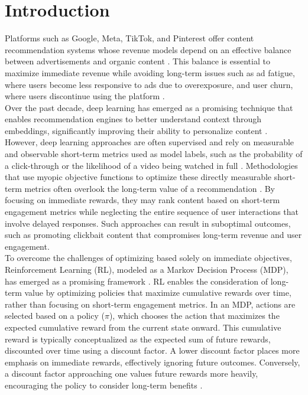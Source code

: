\documentclass[final]{anthology-ch}         %
\begin{document}
\section{Introduction}

Platforms such as Google, Meta, TikTok, and Pinterest offer content recommendation systems whose revenue models depend on an effective balance between advertisements and organic content \cite{zhao2020jointly} \cite{danescu2010competing}. This balance is essential to maximize immediate revenue while avoiding long-term issues such as ad fatigue, where users become less responsive to ads due to overexposure, and user churn, where users discontinue using the platform \cite{sagtani2023quantifying} \cite{silberstein2023combating}.\\

Over the past decade, deep learning has emerged as a promising technique that enables recommendation engines to better understand context through embeddings, significantly improving their ability to personalize content \cite{naumov2019deep} \cite{zhao2024survey}. However, deep learning approaches are often supervised and rely on measurable and observable short-term metrics used as model labels, such as the probability of a click-through or the likelihood of a video being watched in full \cite{nvidia_recommender_systems_2021}. Methodologies that use myopic objective functions to optimize these directly measurable short-term metrics often overlook the long-term value of a recommendation \cite{mazoure2021improving}. By focusing on immediate rewards, they may rank content based on short-term engagement metrics while neglecting the entire sequence of user interactions that involve delayed responses. Such approaches can result in suboptimal outcomes, such as promoting clickbait content that compromises long-term revenue and user engagement.\\


To overcome the challenges of optimizing based solely on immediate objectives, Reinforcement Learning (RL), modeled as a Markov Decision Process (MDP), has emerged as a promising framework \cite{afsar2022reinforcement}. RL enables the consideration of long-term value by optimizing policies that maximize cumulative rewards over time, rather than focusing on short-term engagement metrics. In an MDP, actions are selected based on a policy ($\pi$), which chooses the action that maximizes the expected cumulative reward from the current state onward. This cumulative reward is typically conceptualized as the expected sum of future rewards, discounted over time using a discount factor. A lower discount factor places more emphasis on immediate rewards, effectively ignoring future outcomes. Conversely, a discount factor approaching one values future rewards more heavily, encouraging the policy to consider long-term benefits \cite{Sutton1998}. \\
\end{document}
